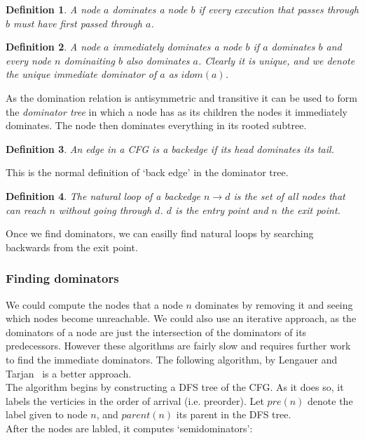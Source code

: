 \documentclass[12pt,a4paper]{article}
\newtheorem{definition}{Definition}
\begin{document}
\begin{definition}\label{def:dominator}
A node $a$ \emph{dominates} a node $b$ if every execution that passes through $b$ must have first passed through $a$.
\end{definition}

\begin{definition}\label{def:immediatedominator}
A node $a$ \emph{immediately dominates} a node $b$ if $a$ dominates $b$ and every node $n$ dominaiting $b$ also dominates $a$. Clearly it is unique, and we denote
the unique immediate dominator of $a$ as $idom(a)$.
\end{definition}

As the domination relation is antisymmetric and transitive it can be used to form the \emph{dominator tree} in which a node has as its children the nodes it
immediately dominates. The node then dominates everything in its rooted subtree.

\begin{definition}\label{def:backedge}
An edge in a CFG is a \emph{backedge} if its head dominates its tail.
\end{definition}

This is the normal definition of `back edge' in the dominator tree.

\begin{definition}\label{def:naturalloop}
The \emph{natural loop} of a backedge $n \to d$ is the set of all nodes that can reach $n$ without going through $d$. $d$ is the \emph{entry point} and $n$ the \emph{exit point}.
\end{definition}

Once we find dominators, we can easilly find natural loops by searching backwards from the exit point.

\subsubsection{Finding dominators}
We could compute the nodes that a node $n$ dominates by removing it and seeing which nodes become unreachable. We could also use an iterative approach, as the dominators of a node are  just the intersection of the dominators of its predecessors. However these algorithms are fairly slow and requires further work to find the immediate dominators.
The following algorithm, by Lengauer and Tarjan~\citep{lengtarj} is a better approach.\\
The algorithm begins by constructing a DFS tree of the CFG. As it does so, it labels the verticies in the order of arrival (i.e. preorder). Let $pre(n)$ denote the label given to node $n$, and $parent(n)$ its parent in the DFS tree.\\
After the nodes are labled, it computes `semidominators':
\end{document}
